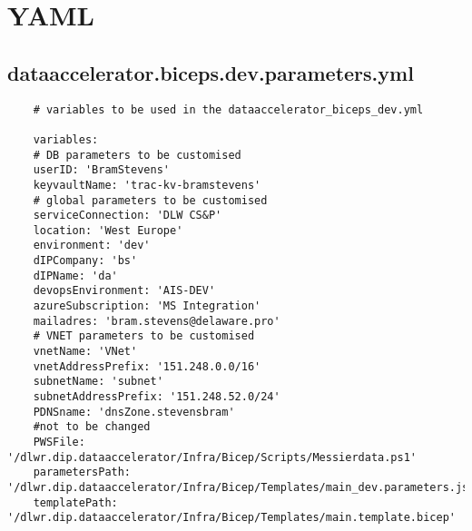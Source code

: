 \documentclass[dutch,dit,thesis]{hogentreport}
\begin{document}
\section{YAML}
\label{sec:YAML}
\subsection{dataaccelerator.biceps.dev.parameters.yml}
\label{sec:dataaccelerator.biceps.dev.parameters.yml}
\begin{lstlisting}
    # variables to be used in the dataaccelerator_biceps_dev.yml

    variables:
    # DB parameters to be customised
    userID: 'BramStevens'
    keyvaultName: 'trac-kv-bramstevens'
    # global parameters to be customised
    serviceConnection: 'DLW CS&P'
    location: 'West Europe'
    environment: 'dev'
    dIPCompany: 'bs'
    dIPName: 'da'
    devopsEnvironment: 'AIS-DEV'
    azureSubscription: 'MS Integration'
    mailadres: 'bram.stevens@delaware.pro'
    # VNET parameters to be customised
    vnetName: 'VNet'
    vnetAddressPrefix: '151.248.0.0/16'
    subnetName: 'subnet'
    subnetAddressPrefix: '151.248.52.0/24'
    PDNSname: 'dnsZone.stevensbram'
    #not to be changed
    PWSFile: '/dlwr.dip.dataaccelerator/Infra/Bicep/Scripts/Messierdata.ps1'
    parametersPath: '/dlwr.dip.dataaccelerator/Infra/Bicep/Templates/main_dev.parameters.json'
    templatePath: '/dlwr.dip.dataaccelerator/Infra/Bicep/Templates/main.template.bicep'

\end{lstlisting}
\end{document}
